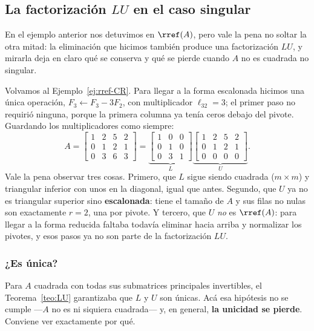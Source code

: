 \subsection{La factorización \texorpdfstring{$LU$}{LU} en el caso singular}
\label{sec:LU-singular}

En el ejemplo anterior nos detuvimos en $\rref(A)$, pero vale la pena no
soltar la otra mitad: la eliminación que hicimos también produce una
factorización $LU$, y mirarla deja en claro qué se conserva y qué se pierde
cuando $A$ no es cuadrada no singular.

Volvamos al Ejemplo~\ref{ej:rref-CR}. Para llegar a la forma escalonada hicimos
una única operación, $F_3\leftarrow F_3-3F_2$, con multiplicador
$\ell_{32}=3$; el primer paso no requirió ninguna, porque la primera columna ya
tenía ceros debajo del pivote. Guardando los multiplicadores como siempre:
\[
A=
\begin{bmatrix}
1 & 2 & 5 & 2 \\
0 & 1 & 2 & 1 \\
0 & 3 & 6 & 3
\end{bmatrix}
=
\underbrace{\begin{bmatrix}
1 & 0 & 0\\
0 & 1 & 0\\
0 & 3 & 1
\end{bmatrix}}_{L}
\underbrace{\begin{bmatrix}
1 & 2 & 5 & 2 \\
0 & 1 & 2 & 1 \\
0 & 0 & 0 & 0
\end{bmatrix}}_{U} .
\]
Vale la pena observar tres cosas. Primero, que $L$ sigue siendo cuadrada
($m\times m$) y triangular inferior con unos en la diagonal, igual que antes.
Segundo, que $U$ ya no es triangular superior sino \textbf{escalonada}: tiene
el tamaño de $A$ y sus filas no nulas son exactamente $r=2$, una por pivote.
Y tercero, que $U$ \emph{no} es $\rref(A)$: para llegar a la forma reducida
faltaba todavía eliminar hacia arriba y normalizar los pivotes, y esos pasos ya
no son parte de la factorización $LU$.

\subsubsection*{¿Es única?}

Para $A$ cuadrada con todas sus submatrices principales invertibles, el
Teorema~\ref{teo:LU} garantizaba que $L$ y $U$ son únicas. Acá esa hipótesis no
se cumple ---$A$ no es ni siquiera cuadrada--- y, en general, \textbf{la
unicidad se pierde}. Conviene ver exactamente por qué.

